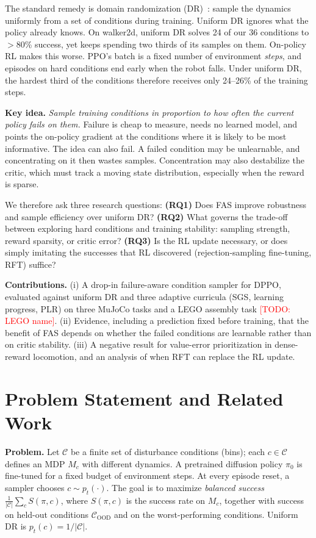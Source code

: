 \documentclass{article}
\newcommand{\todo}[1]{\textcolor{red}{[TODO: #1]}}
\newcommand{\fas}{\textsc{FAS}}
\newcommand{\C}{\mathcal{C}}
\begin{document}
The standard remedy is domain randomization (DR)~\citep{tobin2017dr,peng2018sim2real}: sample the dynamics uniformly from a set of conditions during training.
Uniform DR ignores what the policy already knows. On walker2d, uniform DR solves 24 of our 36 conditions to $>$80\% success, yet keeps spending two thirds of its samples on them.
On-policy RL makes this worse. PPO's batch is a fixed number of environment \emph{steps}, and episodes on hard conditions end early when the robot falls. Under uniform DR, the hardest third of the conditions therefore receives only 24--26\% of the training steps.

\textbf{Key idea.} \emph{Sample training conditions in proportion to how often the current policy fails on them.}
Failure is cheap to measure, needs no learned model, and points the on-policy gradient at the conditions where it is likely to be most informative.
The idea can also fail. A failed condition may be unlearnable, and concentrating on it then wastes samples. Concentration may also destabilize the critic, which must track a moving state distribution, especially when the reward is sparse.

We therefore ask three research questions:
\textbf{(RQ1)} Does \fas{} improve robustness and sample efficiency over uniform DR?
\textbf{(RQ2)} What governs the trade-off between exploring hard conditions and training stability: sampling strength, reward sparsity, or critic error?
\textbf{(RQ3)} Is the RL update necessary, or does simply imitating the successes that RL discovered (rejection-sampling fine-tuning, RFT) suffice?

\textbf{Contributions.}
(i) A drop-in failure-aware condition sampler for DPPO, evaluated against uniform DR and three adaptive curricula (SGS, learning progress, PLR) on three MuJoCo tasks and a LEGO assembly task \todo{LEGO name}.
(ii) Evidence, including a prediction fixed before training, that the benefit of \fas{} depends on whether the failed conditions are learnable rather than on critic stability.
(iii) A negative result for value-error prioritization in dense-reward locomotion, and an analysis of when RFT can replace the RL update.

\section{Problem Statement and Related Work}
\label{sec:problem}

\textbf{Problem.} Let $\C$ be a finite set of disturbance conditions (bins); each $c \in \C$ defines an MDP $M_c$ with different dynamics.
A pretrained diffusion policy $\pi_0$ is fine-tuned for a fixed budget of environment steps. At every episode reset, a sampler chooses $c \sim p_t(\cdot)$.
The goal is to maximize \emph{balanced success} $\frac{1}{|\C|}\sum_{c} S(\pi, c)$, where $S(\pi,c)$ is the success rate on $M_c$, together with success on held-out conditions $\C_{\text{OOD}}$ and on the worst-performing conditions.
Uniform DR is $p_t(c) = 1/|\C|$.
\end{document}
